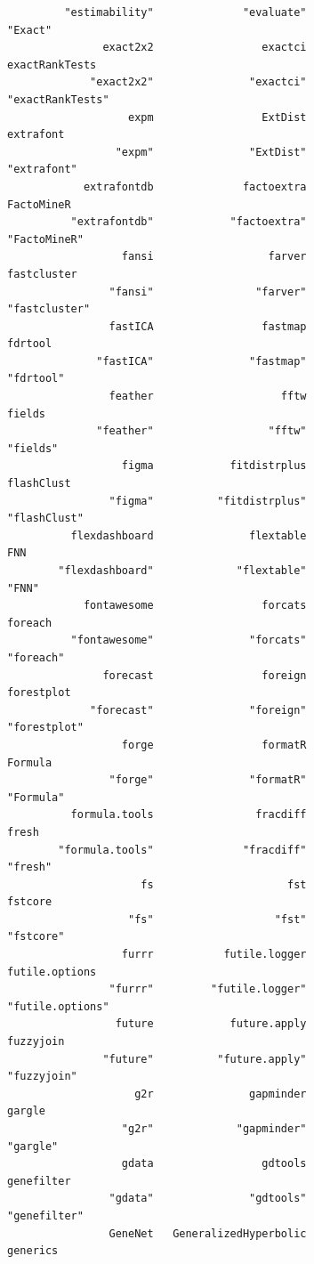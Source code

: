 \documentclass[
  letterpaper,
  DIV=11,
  numbers=noendperiod]{scrreprt}
\begin{document}
\begin{verbatim}
         "estimability"              "evaluate"                 "Exact" 
               exact2x2                 exactci          exactRankTests 
             "exact2x2"               "exactci"        "exactRankTests" 
                   expm                 ExtDist               extrafont 
                 "expm"               "ExtDist"             "extrafont" 
            extrafontdb              factoextra              FactoMineR 
          "extrafontdb"            "factoextra"            "FactoMineR" 
                  fansi                  farver             fastcluster 
                "fansi"                "farver"           "fastcluster" 
                fastICA                 fastmap                 fdrtool 
              "fastICA"               "fastmap"               "fdrtool" 
                feather                    fftw                  fields 
              "feather"                  "fftw"                "fields" 
                  figma            fitdistrplus              flashClust 
                "figma"          "fitdistrplus"            "flashClust" 
          flexdashboard               flextable                     FNN 
        "flexdashboard"             "flextable"                   "FNN" 
            fontawesome                 forcats                 foreach 
          "fontawesome"               "forcats"               "foreach" 
               forecast                 foreign              forestplot 
             "forecast"               "foreign"            "forestplot" 
                  forge                 formatR                 Formula 
                "forge"               "formatR"               "Formula" 
          formula.tools                fracdiff                   fresh 
        "formula.tools"              "fracdiff"                 "fresh" 
                     fs                     fst                 fstcore 
                   "fs"                   "fst"               "fstcore" 
                  furrr           futile.logger          futile.options 
                "furrr"         "futile.logger"        "futile.options" 
                 future            future.apply               fuzzyjoin 
               "future"          "future.apply"             "fuzzyjoin" 
                    g2r               gapminder                  gargle 
                  "g2r"             "gapminder"                "gargle" 
                  gdata                 gdtools              genefilter 
                "gdata"               "gdtools"            "genefilter" 
                GeneNet   GeneralizedHyperbolic                generics 

\end{verbatim}
\end{document}
